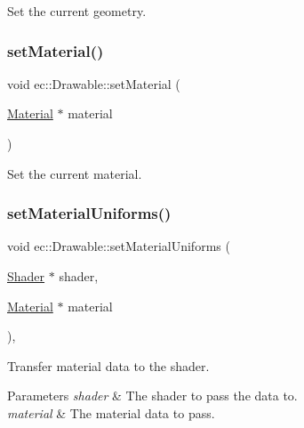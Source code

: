 Set the current geometry. 

\mbox{\label{classec_1_1_drawable_a0fc7868639a83830d4b60dfad85a0826}} 
\subsubsection{\texorpdfstring{set\+Material()}{setMaterial()}}
{\footnotesize\ttfamily void ec\+::\+Drawable\+::set\+Material (\begin{DoxyParamCaption}\item[{\mbox{\hyperlink{classec_1_1_material}{Material}} $\ast$}]{material }\end{DoxyParamCaption})}



Set the current material. 

\mbox{\label{classec_1_1_drawable_af2b64f8e6faa71bee8cccb14387d8432}} 
\subsubsection{\texorpdfstring{set\+Material\+Uniforms()}{setMaterialUniforms()}}
{\footnotesize\ttfamily void ec\+::\+Drawable\+::set\+Material\+Uniforms (\begin{DoxyParamCaption}\item[{\mbox{\hyperlink{classec_1_1_shader}{Shader}} $\ast$}]{shader,  }\item[{\mbox{\hyperlink{classec_1_1_material}{Material}} $\ast$}]{material }\end{DoxyParamCaption})\hspace{0.3cm}{\ttfamily [static]}, {\ttfamily [protected]}}



Transfer material data to the shader. 


\begin{DoxyParams}{Parameters}
{\em shader} & The shader to pass the data to. \\
\hline
{\em material} & The material data to pass. \\
\hline
\end{DoxyParams}
\mbox{\label{classec_1_1_drawable_a413f373bb2cba109497377e18b084048}} 
